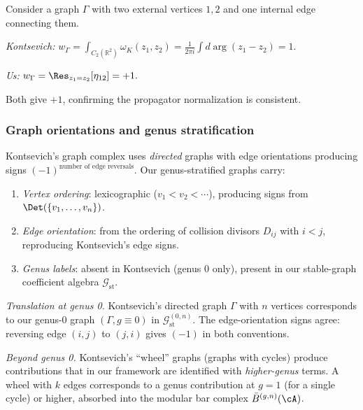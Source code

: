 \begin{example}
Consider a graph $\Gamma$ with two external vertices $1, 2$ and one
internal edge connecting them.

\emph{Kontsevich:}
$w_\Gamma = \int_{C_2(\mathbb{R}^2)} \omega_K(z_1, z_2) = \frac{1}{2\pi i}
\int d\arg(z_1 - z_2) = 1.$

\emph{Us:}
$w_\Gamma = \Res_{z_1 = z_2}[\eta_{12}] = +1.$

Both give $+1$, confirming the propagator normalization is consistent.
\end{example}

\subsubsection{Graph orientations and genus stratification}

Kontsevich's graph complex uses \emph{directed} graphs with edge orientations
producing signs $(-1)^{\text{number of edge reversals}}$. Our genus-stratified
graphs carry:
\begin{enumerate}[label=(\roman*)]
\item \emph{Vertex ordering}: lexicographic ($v_1 < v_2 < \cdots$), producing
signs from $\Det(\{v_1,\ldots,v_n\})$.
\item \emph{Edge orientation}: from the ordering of collision divisors
$D_{ij}$ with $i < j$, reproducing Kontsevich's edge signs.
\item \emph{Genus labels}: absent in Kontsevich (genus 0 only), present in
our stable-graph coefficient algebra $\mathcal{G}_{\mathrm{st}}$.
\end{enumerate}

\emph{Translation at genus 0.} Kontsevich's directed graph $\Gamma$
with $n$ vertices corresponds to our genus-0 graph $(\Gamma, g \equiv 0)$
in $\mathcal{G}_{\mathrm{st}}^{(0,n)}$. The edge-orientation signs agree:
reversing edge $(i,j)$ to $(j,i)$ gives $(-1)$ in both conventions.

\emph{Beyond genus 0.} Kontsevich's ``wheel'' graphs (graphs with cycles)
produce contributions that in our framework are identified with
\emph{higher-genus} terms. A wheel with $k$ edges corresponds to a
genus contribution at $g = 1$ (for a single cycle) or higher, absorbed
into the modular bar complex $\bar{B}^{(g,n)}(\cA)$.



